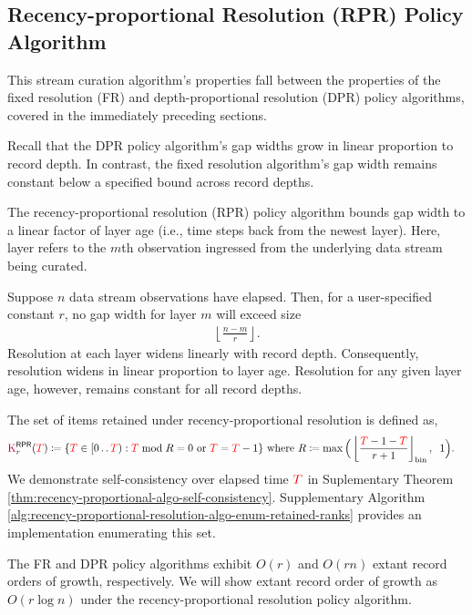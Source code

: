 \subsection{Recency-proportional Resolution (RPR) Policy Algorithm}
\label{sec:recency-proportional-resolution-algo}

This stream curation algorithm's properties fall between the properties of the fixed resolution (FR) and depth-proportional resolution (DPR) policy algorithms, covered in the immediately preceding sections.

Recall that the DPR policy algorithm's gap widths grow in linear proportion to record depth.
In contrast, the fixed resolution algorithm's gap width remains constant below a specified bound across record depths.

The recency-proportional resolution (RPR) policy algorithm bounds gap width to a linear factor of layer age (i.e., time steps back from the newest layer).
Here, layer refers to the $m$th observation ingressed from the underlying data stream being curated.

Suppose $n$ data stream observations have elapsed.
Then, for a user-specified constant $r$, no gap width for layer $m$ will exceed size
\begin{align}
  \left\lfloor \frac{n - m}{r} \right\rfloor.
  \label{eqn:rpr-gap}
\end{align}
Resolution at each layer widens linearly with record depth.
Consequently, resolution widens in linear proportion to layer age.
Resolution for any given layer age, however, remains constant for all record depths.

The set of items retained under recency-proportional resolution is defined as,
\begin{align}
\colorK^{\mathsf{RPR}}_r(\colorT)
&\coloneq \{
\colorTbar \in [0\twodots\colorT)
: \colorTbar \bmod R = 0 \text{ or } \colorTbar = \colorT - 1
\}
\text{ where }
R \coloneq \max\Big(\left \lfloor \frac{\colorT  - 1 - \colorTbar}{r + 1} \right \rfloor_{\mathrm{bin}}, \;\; 1\Big).
\label{eqn:rpr_kept}
\end{align}
We demonstrate self-consistency over elapsed time $\colorT$ in Suplementary Theorem \ref{thm:recency-proportional-algo-self-consistency}.
Supplementary Algorithm \ref{alg:recency-proportional-resolution-algo-enum-retained-ranks} provides an implementation enumerating this set.

The FR and DPR policy algorithms exhibit $O(r)$ and $O(rn)$ extant record orders of growth, respectively.
We will show extant record order of growth as $O(r\log{n})$ under the recency-proportional resolution policy algorithm.

